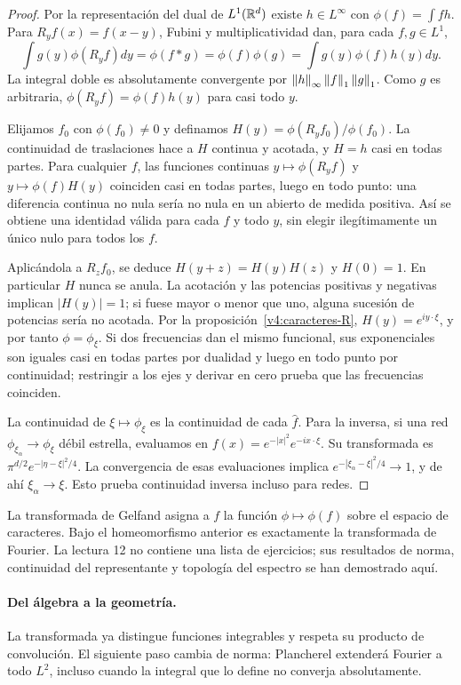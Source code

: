 \begin{proof}
Por la representación del dual de $L^1(\mathbb R^d)$ existe $h\in L^\infty$ con $\phi(f)=\int fh$. Para $R_yf(x)=f(x-y)$, Fubini y multiplicatividad dan, para cada $f,g\in L^1$,
\[
 \int g(y)\phi(R_yf)dy=\phi(f*g)=\phi(f)\phi(g)=\int g(y)\phi(f)h(y)dy.
\]
La integral doble es absolutamente convergente por $\left\lVert h\right\rVert_\infty\left\lVert f\right\rVert_1\left\lVert g\right\rVert_1$. Como $g$ es arbitraria, $\phi(R_yf)=\phi(f)h(y)$ para casi todo $y$.

Elijamos $f_0$ con $\phi(f_0)\ne0$ y definamos $H(y)=\phi(R_yf_0)/\phi(f_0)$. La continuidad de traslaciones hace a $H$ continua y acotada, y $H=h$ casi en todas partes. Para cualquier $f$, las funciones continuas $y\mapsto\phi(R_yf)$ y $y\mapsto\phi(f)H(y)$ coinciden casi en todas partes, luego en todo punto: una diferencia continua no nula sería no nula en un abierto de medida positiva. Así se obtiene una identidad válida para cada $f$ y todo $y$, sin elegir ilegítimamente un único nulo para todos los $f$.

Aplicándola a $R_zf_0$, se deduce $H(y+z)=H(y)H(z)$ y $H(0)=1$. En particular $H$ nunca se anula. La acotación y las potencias positivas y negativas implican $|H(y)|=1$; si fuese mayor o menor que uno, alguna sucesión de potencias sería no acotada. Por la proposición~\ref{v4:caracteres-R}, $H(y)=e^{iy\cdot\xi}$, y por tanto $\phi=\phi_\xi$. Si dos frecuencias dan el mismo funcional, sus exponenciales son iguales casi en todas partes por dualidad y luego en todo punto por continuidad; restringir a los ejes y derivar en cero prueba que las frecuencias coinciden.

La continuidad de $\xi\mapsto\phi_\xi$ es la continuidad de cada $\widehat f$. Para la inversa, si una red $\phi_{\xi_\alpha}\to\phi_\xi$ débil estrella, evaluamos en $f(x)=e^{-|x|^2}e^{-ix\cdot\xi}$. Su transformada es $\pi^{d/2}e^{-|\eta-\xi|^2/4}$. La convergencia de esas evaluaciones implica $e^{-|\xi_\alpha-\xi|^2/4}\to1$, y de ahí $\xi_\alpha\to\xi$. Esto prueba continuidad inversa incluso para redes.
\end{proof}
La transformada de Gelfand asigna a $f$ la función $\phi\mapsto\phi(f)$ sobre el espacio de caracteres. Bajo el homeomorfismo anterior es exactamente la transformada de Fourier. La lectura 12 no contiene una lista de ejercicios; sus resultados de norma, continuidad del representante y topología del espectro se han demostrado aquí.

\paragraph{Del álgebra a la geometría.}
La transformada ya distingue funciones integrables y respeta su producto de convolución. El siguiente paso cambia de norma: Plancherel extenderá Fourier a todo $L^2$, incluso cuando la integral que lo define no converja absolutamente.

